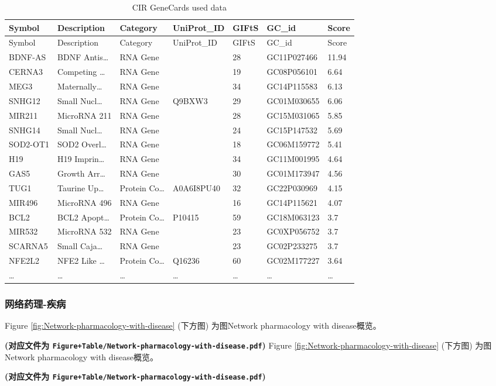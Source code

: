 \documentclass[
]{article}
\begin{document}
\begin{longtable}[]{@{}lllllll@{}}
\caption{\label{tab:CIR-GeneCards-used-data}CIR GeneCards used data}\tabularnewline
\toprule
Symbol & Description & Category & UniProt\_ID & GIFtS & GC\_id & Score\tabularnewline
\midrule
\endfirsthead
\toprule
Symbol & Description & Category & UniProt\_ID & GIFtS & GC\_id & Score\tabularnewline
\midrule
\endhead
BDNF-AS & BDNF Antis\ldots{} & RNA Gene & & 28 & GC11P027466 & 11.94\tabularnewline
CERNA3 & Competing \ldots{} & RNA Gene & & 19 & GC08P056101 & 6.64\tabularnewline
MEG3 & Maternally\ldots{} & RNA Gene & & 34 & GC14P115583 & 6.13\tabularnewline
SNHG12 & Small Nucl\ldots{} & RNA Gene & Q9BXW3 & 29 & GC01M030655 & 6.06\tabularnewline
MIR211 & MicroRNA 211 & RNA Gene & & 28 & GC15M031065 & 5.85\tabularnewline
SNHG14 & Small Nucl\ldots{} & RNA Gene & & 24 & GC15P147532 & 5.69\tabularnewline
SOD2-OT1 & SOD2 Overl\ldots{} & RNA Gene & & 18 & GC06M159772 & 5.41\tabularnewline
H19 & H19 Imprin\ldots{} & RNA Gene & & 34 & GC11M001995 & 4.64\tabularnewline
GAS5 & Growth Arr\ldots{} & RNA Gene & & 30 & GC01M173947 & 4.56\tabularnewline
TUG1 & Taurine Up\ldots{} & Protein Co\ldots{} & A0A6I8PU40 & 32 & GC22P030969 & 4.15\tabularnewline
MIR496 & MicroRNA 496 & RNA Gene & & 16 & GC14P115621 & 4.07\tabularnewline
BCL2 & BCL2 Apopt\ldots{} & Protein Co\ldots{} & P10415 & 59 & GC18M063123 & 3.7\tabularnewline
MIR532 & MicroRNA 532 & RNA Gene & & 23 & GC0XP056752 & 3.7\tabularnewline
SCARNA5 & Small Caja\ldots{} & RNA Gene & & 23 & GC02P233275 & 3.7\tabularnewline
NFE2L2 & NFE2 Like \ldots{} & Protein Co\ldots{} & Q16236 & 60 & GC02M177227 & 3.64\tabularnewline
\ldots{} & \ldots{} & \ldots{} & \ldots{} & \ldots{} & \ldots{} & \ldots{}\tabularnewline
\bottomrule
\end{longtable}

\hypertarget{ux7f51ux7edcux836fux7406-ux75beux75c5}{%
\subsubsection{网络药理-疾病}\label{ux7f51ux7edcux836fux7406-ux75beux75c5}}

Figure \ref{fig:Network-pharmacology-with-disease} (下方图) 为图Network pharmacology with disease概览。

\textbf{(对应文件为 \texttt{Figure+Table/Network-pharmacology-with-disease.pdf})}
Figure \ref{fig:Network-pharmacology-with-disease} (下方图) 为图Network pharmacology with disease概览。

\textbf{(对应文件为 \texttt{Figure+Table/Network-pharmacology-with-disease.pdf})}
\end{document}
